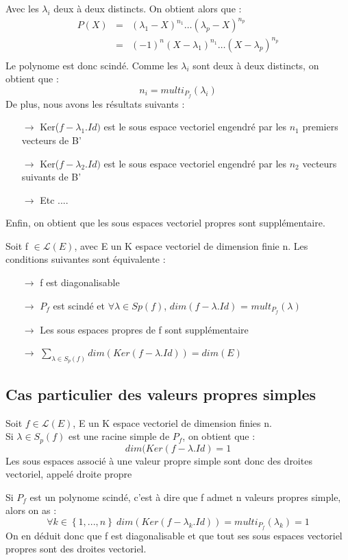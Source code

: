 \begin{de}
Avec les $\lambda_i$ deux à deux distincts. On obtient alors que : 
\begin{eqnarray*}
  P(X) & = & (\lambda_1-X)^{n_1}\dots(\lambda_p-X)^{n_p}\nonumber \\
   & = & (-1)^n (X-\lambda_1)^{n_1}\dots(X-\lambda_p)^{n_p} \nonumber \\
\end{eqnarray*}
Le polynome est donc scindé.
Comme les $\lambda_i$ sont deux à deux distincts, on obtient que : 
$$n_i = multi_{P_f}(\lambda_i)$$
De plus, nous avons les résultats suivants :
\begin{itemize}
 \item[$\rightarrow$]Ker($f-\lambda_1.Id)$ est le sous espace vectoriel engendré par les $n_1$ premiers vecteurs de B'
 \item[$\rightarrow$]Ker($f-\lambda_2.Id)$ est le sous espace vectoriel engendré par les $n_2$ vecteurs suivants de B'
 \item[$\rightarrow$]Etc ....
\end{itemize}
Enfin, on obtient que les sous espaces vectoriel propres sont supplémentaire.
\end{de}
\begin{theo}
Soit f $\in \mathcal{L}(E)$, avec E un K espace vectoriel de dimension finie n. Les conditions suivantes sont équivalente :
\begin{itemize}
 \item[$\rightarrow$] f est diagonalisable
 \item[$\rightarrow$] $P_f$ est scindé et $\forall \lambda \in Sp(f)$, $dim(f-\lambda.Id)$ = $mult_{P_f}(\lambda)$
 \item[$\rightarrow$] Les sous espaces propres de f sont supplémentaire
 \item[$\rightarrow$] $\underset{\lambda \in S_p(f)}\sum dim(Ker(f-\lambda.Id)) = dim(E)$
\end{itemize}
\end{theo}
\subsection{Cas particulier des valeurs propres simples}
\begin{prop}
Soit $f\in \mathcal{L}(E)$, E un K espace vectoriel de dimension finies n.\\
Si $\lambda \in S_p(f)$ est une racine simple de $P_f$, on obtient que : 
$$dim(Ker(f-\lambda.Id) = 1 $$
Les sous espaces associé à une valeur propre simple sont donc des droites vectoriel, appelé droite propre
\end{prop}
\begin{prop}
Si $P_f$ est un polynome scindé, c'est à dire que f admet n valeurs propres simple, alors on as : 
$$\forall k \in \left\lbrace 1,...,n \right\rbrace~ dim(Ker(f-\lambda_k.Id)) = multi_{P_f}(\lambda_k) = 1 $$
On en déduit donc que f est diagonalisable et que tout ses sous espaces vectoriel propres sont des droites vectoriel.
\end{prop}
